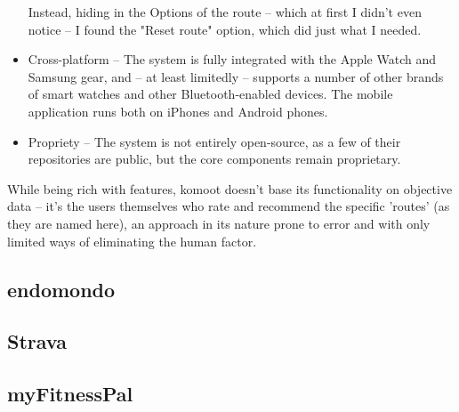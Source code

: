 \begin{itemize}
    Instead, hiding in the Options of the route -- which at first I didn't even notice -- I found the "Reset route" option, which did just what I needed.
    \item Cross-platform -- The system is fully integrated with the Apple Watch and Samsung gear, and -- at least limitedly -- supports a number of other brands of smart watches and other Bluetooth-enabled devices.
    The mobile application runs both on iPhones and Android phones.
    \item Propriety -- The system is not entirely open-source, as a few of their repositories are public, but the core components remain proprietary. 
\end{itemize}

While being rich with features, komoot doesn't base its functionality on objective data -- it's the users themselves who rate and recommend the specific 'routes' (as they are named here),
an approach in its nature prone to error and with only limited ways of eliminating the human factor.

\subsection{endomondo}

\subsection{Strava}

\subsection{myFitnessPal}

